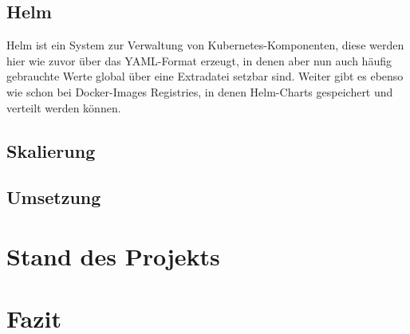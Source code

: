 \documentclass[12pt,a4paper]{scrartcl}
\begin{document}
\subsection{Helm}

Helm ist ein System zur Verwaltung von Kubernetes-Komponenten, diese werden hier wie zuvor über das YAML-Format  erzeugt, in denen aber nun auch häufig gebrauchte Werte global über eine Extradatei setzbar sind. Weiter gibt es ebenso wie schon bei Docker-Images Registries, in denen Helm-Charts gespeichert und verteilt werden können.

\subsection{Skalierung} 



\subsection{Umsetzung}



\section{Stand des Projekts} \label{project_status}



\section{Fazit}\label{conclusion}

\newpage


\printbibliography
{}
\end{document}
